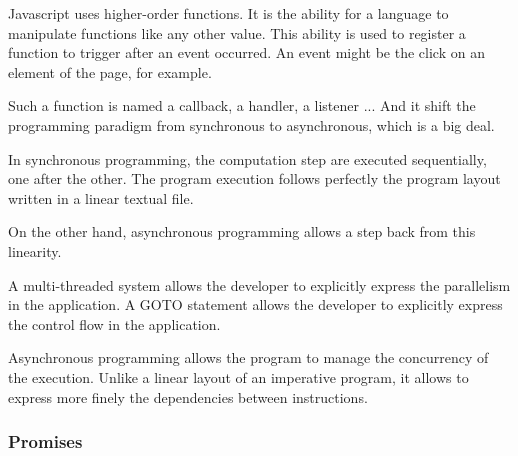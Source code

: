 Javascript uses higher-order functions.
It is the ability for a language to manipulate functions like any other value.
This ability is used to register a function to trigger after an event occurred.
An event might be the click on an element of the page, for example.

Such a function is named a callback, a handler, a listener ...
And it shift the programming paradigm from synchronous to asynchronous, which is a big deal.

In synchronous programming, the computation step are executed sequentially, one after the other.
The program execution follows perfectly the program layout written in a linear textual file.

On the other hand, asynchronous programming allows a step back from this linearity.


A multi-threaded system allows the developer to explicitly express the parallelism in the application.
A GOTO statement allows the developer to explicitly express the control flow in the application.


Asynchronous programming allows the program to manage the concurrency of the execution.
Unlike a linear layout of an imperative program, it allows to express more finely the dependencies between instructions.



\subsubsection{Promises}


